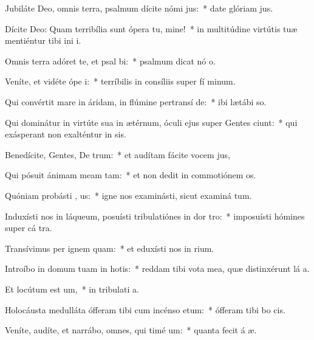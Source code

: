 \item Jubiláte Deo, omnis terra, psalmum dícite nómi jus:~* date glóriam  jus.
\item Dícite Deo: Quam terribília sunt ópera tu, mine!~* in multitúdine virtútis tuæ mentiéntur tibi ini i.
\item Omnis terra adóret te, et psal bi:~* psalmum dicat nó o.
\item Veníte, et vidéte ópe i:~* terríbilis in consíliis super fí minum.
\item Qui convértit mare in áridam, in flúmine pertransí de:~* ibi lætábi  so.
\item Qui dominátur in virtúte sua in ætérnum, óculi ejus super Gentes ciunt:~* qui exásperant non exalténtur in sis.
\item Benedícite, Gentes, De trum:~* et audítam fácite vocem  jus,
\item Qui pósuit ánimam meam  tam:~* et non dedit in commotiónem  os.
\item Quóniam probásti , us:~* igne nos examinásti, sicut examiná tum.
\item Induxísti nos in láqueum, posuísti tribulatiónes in dor tro:~* imposuísti hómines super cá tra.
\item Transívimus per ignem  quam:~* et eduxísti nos in rium.
\item Introíbo in domum tuam in hotis:~* reddam tibi vota mea, quæ distinxérunt lá a.
\item Et locútum est  um,~* in tribulati a.
\item Holocáusta medulláta ófferam tibi cum incénso etum:~* ófferam tibi bo  cis.
\item Veníte, audíte, et narrábo, omnes, qui timé um:~* quanta fecit á æ.
